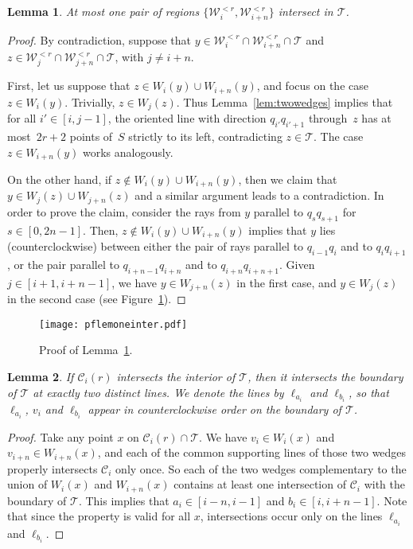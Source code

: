 \documentclass[english,11pt]{article}
\newtheorem{lemma}{Lemma}
\newcommand{\bigc}{\mathcal C}
\newcommand{\bigt}{\mathcal T}
\newcommand{\bigw}{\mathcal W}
\begin{document}
\begin{lemma}
\label{lem:oneinter}
At most one pair of regions $\{ \bigw_i^{< r} , \bigw_{i{+}n}^{< r}\}$ intersect in $\bigt$.
\end{lemma}
\begin{proof}
By contradiction, suppose that $y\in\bigw_i^{<r}\cap\bigw_{i{+}n}^{<r}\cap\bigt$ and 
$z\in\bigw_j^{<r}\cap\bigw_{j{+}n}^{<r}\cap\bigt$, with $j\not= i{+}n$.

First, let us suppose that $z\in W_i(y)\cup W_{i{+}n}(y)$, and focus on the case $z\in W_i(y)$. Trivially, $z\in W_j(z)$. Thus Lemma~\ref{lem:twowedges} implies that for all $i'\in[i,j{-}1]$, the oriented line with direction $q_{i'}q_{i'{+}1}$ through~$z$ has at most~$2r{+}2$ points of~$S$ strictly to its left, contradicting $z\in\bigt$. The case $z\in W_{i{+}n}(y)$ works analogously.

On the other hand, if $z\not\in W_i(y)\cup W_{i{+}n}(y)$, then we claim that $y\in W_j(z)\cup W_{j{+}n}(z)$ and a similar argument leads to a contradiction. 
In order to prove the claim, consider the rays from $y$ parallel to $q_sq_{s{+}1}$ for $s\in [0,2n-1]$. Then, $z\not\in W_i(y)\cup W_{i{+}n}(y)$ implies that $y$ lies (counterclockwise) between either the pair of rays parallel to $q_{i{-}1}q_{i}$ and to $q_{i}q_{i{+}1}$, or the pair parallel to $q_{i{+}n{-}1}q_{i{+}n}$ and to $q_{i{+}n}q_{i{+}n{+}1}$. Given $j\in[i{+}1,i{+}n{-}1]$, we have $y\in W_{j{+}n}(z)$ in the first case, and $y\in W_j(z)$ in the second case (see Figure~\ref{fig:pflemoneinter}).
\end{proof}

\begin{figure}[htb]
\begin{center}
\texttt{[image: pflemoneinter.pdf]}
\end{center}
\caption{\label{fig:pflemoneinter}Proof of Lemma~\ref{lem:oneinter}.}
\end{figure}

\begin{lemma}\label{lem:C_and_T}
If  $\bigc_i(r)$ intersects the interior of
$\bigt$, then it intersects the boundary of $\bigt$ at exactly two distinct lines.
We denote the lines by $\ell_{a_i}$ and $\ell_{b_i}$, so that $\ell_{a_{i}}$, $v_{i}$ and $\ell_{b_{i}}$ appear in counterclockwise order on the boundary of $\bigt$.
\end{lemma}
\begin{proof}

Take any point $x$ on $\bigc_i(r)\cap\bigt$. We have $v_i \in W_i(x)$ and $v_{i{+}n} \in W_{i{+}n}(x)$, and each of the common
supporting lines of those two wedges  properly intersects $\bigc_i$ only once. 
So each of the two wedges complementary to the union of $W_i(x)$ and $W_{i{+}n}(x)$ contains at least one
intersection of $\bigc_i$ with the boundary of $\bigt$. 
This implies that  $a_i \in [i{-}n,i{-}1]$ and $b_i\in [i,i{+}n{-}1]$.
Note that since  the property is valid for all $x$, intersections occur only on the lines $\ell_{a_{i}}$ and $\ell_{b_{i}}$.
\end{proof}
\end{document}
